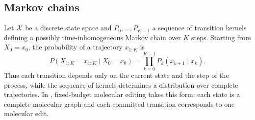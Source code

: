 %
%
%
%
\label{sec:prelim}

\subsection{Markov chains}
\label{sec:prelim-chain}

Let $\mathcal{X}$ be a discrete state space and $P_0,\dots,P_{K-1}$ a sequence of transition kernels defining a possibly time-inhomogeneous Markov chain over $K$ steps. Starting from $X_0=x_0$, the probability of a trajectory $x_{1:K}$ is
\begin{equation}
P(X_{1:K}=x_{1:K}\mid X_0=x_0)=\prod_{k=0}^{K-1}P_k(x_{k+1}\mid x_k).
\label{eq:chain}
\end{equation}
Thus each transition depends only on the current state and the step of the process, while the sequence of kernels determines a distribution over complete trajectories. In \method{}, fixed-budget molecular editing takes this form: each state is a complete molecular graph and each committed transition corresponds to one molecular edit.


